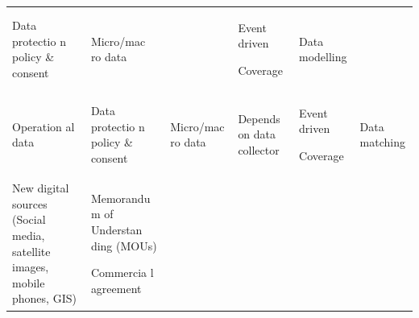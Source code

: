 \documentclass[
]{article}
\begin{document}
\begin{longtable}[]{@{}llllll@{}}
\begin{minipage}[t]{0.14\columnwidth}
Data
protectio
n
policy \&
consent\strut
\end{minipage} & \begin{minipage}[t]{0.14\columnwidth}\raggedright
Micro/mac
ro
data\strut
\end{minipage} & \begin{minipage}[t]{0.14\columnwidth}\raggedright
\strut
\end{minipage} & \begin{minipage}[t]{0.14\columnwidth}\raggedright
Event
driven

Coverage\strut
\end{minipage} & \begin{minipage}[t]{0.14\columnwidth}\raggedright
Data
modelling\strut
\end{minipage}\tabularnewline
\begin{minipage}[t]{0.14\columnwidth}\raggedright
Operation
al
data\strut
\end{minipage} & \begin{minipage}[t]{0.14\columnwidth}\raggedright
Data
protectio
n
policy \&
consent\strut
\end{minipage} & \begin{minipage}[t]{0.14\columnwidth}\raggedright
Micro/mac
ro
data\strut
\end{minipage} & \begin{minipage}[t]{0.14\columnwidth}\raggedright
Depends
on data
collector\strut
\end{minipage} & \begin{minipage}[t]{0.14\columnwidth}\raggedright
Event
driven

Coverage\strut
\end{minipage} & \begin{minipage}[t]{0.14\columnwidth}\raggedright
Data
matching\strut
\end{minipage}\tabularnewline
\begin{minipage}[t]{0.14\columnwidth}\raggedright
New
digital
sources
(Social
media,
satellite
images,
mobile
phones,
GIS)\strut
\end{minipage} & \begin{minipage}[t]{0.14\columnwidth}\raggedright
Memorandu
m
of
Understan
ding
(MOUs)

Commercia
l
agreement


\end{minipage}
\end{longtable}
\end{document}
